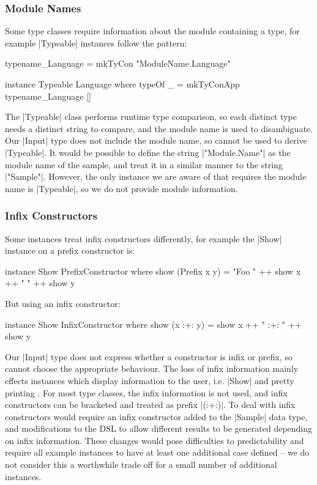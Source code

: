 \documentclass{llncs}
\begin{document}
\subsubsection{Module Names}
\label{sec:failure_typeable}

Some type classes require information about the module containing a type, for example |Typeable| instances \cite{lammel:syb} follow the pattern:

\begin{code}
typename_Language = mkTyCon "ModuleName.Language"

instance Typeable Language where
    typeOf _ = mkTyConApp typename_Language []
\end{code}

The |Typeable| class performs runtime type comparison, so each distinct type needs a distinct string to compare, and the module name is used to disambiguate. Our |Input| type does not include the module name, so cannot be used to derive |Typeable|. It would be possible to define the string |"Module.Name"| as the module name of the sample, and treat it in a similar manner to the string |"Sample"|. However, the only instance we are aware of that requires the module name is |Typeable|, so we do not provide module information.

\subsubsection{Infix Constructors}

Some instances treat infix constructors differently, for example the |Show| instance on a prefix constructor is:

\begin{code}
instance Show PrefixConstructor where
    show (Prefix x y) = "Foo " ++ show x ++ " " ++ show y
\end{code}

\noindent But using an infix constructor:

\begin{code}
instance Show InfixConstructor where
    show (x :+: y) = show x ++ " :+: " ++ show y
\end{code}

Our |Input| type does not express whether a constructor is infix or prefix, so cannot choose the appropriate behaviour. The loss of infix information mainly effects instances which display information to the user, i.e. |Show| and pretty printing \cite{hughes:pretty_printing}. For most type classes, the infix information is not used, and infix constructors can be bracketed and treated as prefix |(:+:)|. To deal with infix constructors would require an infix constructor added to the |Sample| data type, and modifications to the DSL to allow different results to be generated depending on infix information. These changes would pose difficulties to predictability and require all example instances to have at least one additional case defined -- we do not consider this a worthwhile trade off for a small number of additional instances.
\end{document}
